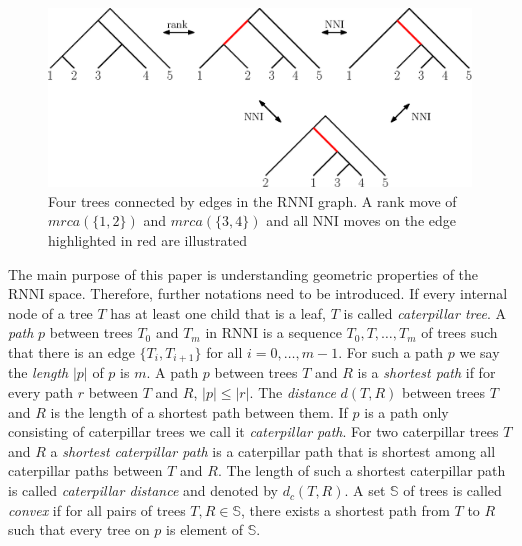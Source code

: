 \documentclass[11pt, a4paper]{article}
\newcommand{\nni}{\mathrm{NNI}}
\newcommand{\rnni}{\mathrm{RNNI}}
\begin{document}
\begin{figure}[H]
	\centering
	\includegraphics[width=\textwidth]{RNNI}
	\caption{Four trees connected by edges in the $\rnni$ graph. A rank move of $mrca(\{1,2\})$ and $mrca(\{3,4\})$ and all $\nni$ moves on the edge highlighted in red are illustrated}
	\label{fig:NNI_vs_RNNI}
\end{figure}


The main purpose of this paper is understanding geometric properties of the $\rnni$ space.
Therefore, further notations need to be introduced.
If every internal node of a tree $T$ has at least one child that is a leaf, $T$ is called \emph{caterpillar tree}.
A \emph{path} $p$ between trees $T_0$ and $T_m$ in $\rnni$ is a sequence $T_0, T, \ldots, T_m$ of trees such that there is an edge $\{T_i, T_{i+1}\}$ for all $i=0,\ldots,m-1$.
For such a path $p$ we say the \emph{length} $|p|$ of $p$ is $m$.
A path $p$ between trees $T$ and $R$ is a \emph{shortest path} if for every path $r$ between $T$ and $R$, $|p| \leq |r|$.
The \emph{distance} $d(T,R)$ between trees $T$ and $R$ is the length of a shortest path between them.
If $p$ is a path only consisting of caterpillar trees we call it \emph{caterpillar path}.
For two caterpillar trees $T$ and $R$ a \emph{shortest caterpillar path} is a caterpillar path that is shortest among all caterpillar paths between $T$ and $R$.
The length of such a shortest caterpillar path is called \emph{caterpillar distance} and denoted by $d_c(T,R)$.
A set $\mathbb S$ of trees is called \emph{convex} if for all pairs of trees $T,R \in \mathbb S$, there exists a shortest path from $T$ to $R$ such that every tree on $p$ is element of $\mathbb S$.


\end{document}
